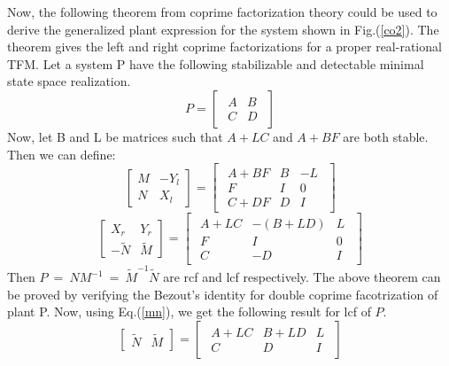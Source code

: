 \documentclass[a4paper,12pt]{article}
\begin{document}
	Now, the following theorem from coprime factorization theory could be used to derive the generalized plant expression for the system shown in Fig.(\ref{co2}).
	The theorem gives the left and right coprime factorizations for a proper real-rational TFM. Let a system P have the following stabilizable and detectable minimal state space realization.
	\begin{equation}
	P =
	\begin{bmatrix}
	\begin{array}{c|c}
	A & B \\ \hline
	C & D	
	\end{array}
	\end{bmatrix}
	\label{min}
	\end{equation}
	Now, let B and L be matrices such that $A+LC$ and $A+BF$ are both stable. Then we can define:
	\begin{equation}
	\begin{bmatrix}
	M & -Y_{l} \\
	N & X_{l}
	\end{bmatrix}
	=
	\begin{bmatrix}
	\begin{array}{c|cc}
	A+BF & B & -L \\ \hline
	F & I & 0\\ 
	C+DF & D & I
	\end{array}
	\end{bmatrix}
	\end{equation}
	\begin{equation}
	\begin{bmatrix}
	X_{r} & Y_{r} \\
	-\tilde{N} & \tilde{M}
	\end{bmatrix}
	=
	\begin{bmatrix}
	\begin{array}{c|cc}
	A+LC & -(B+LD) & L \\ \hline
	F & I & 0\\ 
	C & -D & I
	\end{array}
	\end{bmatrix}
	\label{mn}
	\end{equation}
	Then $P\:=\:NM^{-1}\:=\:\tilde{M}^{-1}\tilde{N}$ are rcf and lcf respectively. The above theorem can be proved by verifying the Bezout's identity for double coprime  facotrization of plant P. Now, using Eq.(\ref{mn}), we get the following result for lcf of $P$.
	\begin{equation}
	\begin{bmatrix}
	\tilde{N} & \tilde{M}
	\end{bmatrix}
	= \begin{bmatrix}
	\begin{array}{c|cc}
	A+LC & B+LD & L \\ \hline C & D & I	
	\end{array}
	\end{bmatrix}
	\label{mn2}
	\end{equation}
\end{document}
